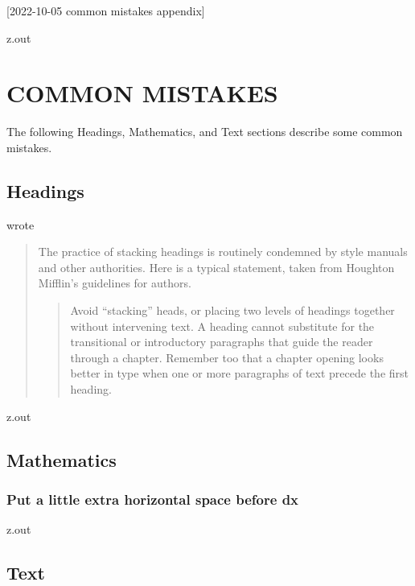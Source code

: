 [2022-10-05 common mistakes appendix]

\begin{VerbatimOut}{z.out}
\chapter{COMMON MISTAKES}

The following Headings, Mathematics, and Text
sections describe some common mistakes.


\section{Headings}

\textcite[page~289]{farkas2011}
wrote

\begin{quotation}
  The practice of stacking headings
  is routinely condemned by style manuals
  and other authorities.
  Here is a typical statement,
  taken from Houghton Mifflin's guidelines for authors.
  \begin{quotation}
    Avoid ``stacking'' heads,
    or placing two levels
    of headings together without intervening text.
    A heading cannot substitute
    for the transitional
    or introductory paragraphs
    that guide the reader through a chapter.
    Remember too that a chapter opening looks better in type
    when one
    or more paragraphs
    of text precede the first heading.
  \end{quotation}
\end{quotation}
\end{VerbatimOut}

\MyIO


\begin{VerbatimOut}{z.out}


\section{Mathematics}

\subsection{Put a little extra horizontal space before dx}
\end{VerbatimOut}
\MyIO


\begin{VerbatimOut}{z.out}


\section{Text}
\end{VerbatimOut}

